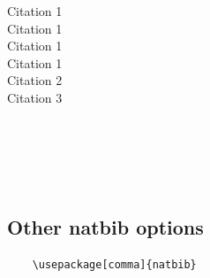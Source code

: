 \documentclass[12pts]{article}
\begin{document}
	Citation 1 \citet[p.~215]{dupas2013savings} \\
	Citation 1 \citep[p.~215]{dupas2013savings} \\
	
	
	Citation 1 \citep[see][]{dupas2013savings} \\
	Citation 1 \citep[see][p.~215]{dupas2013savings} \\
	
	Citation 2 \citep{alix2012forest} \\
	Citation 3 \citep*{alix2012forest}
	
	\citeauthor{de2008returns} \\
	\citeauthor*{de2008returns} \\
	\citeyear{de2008returns} \\ 
	\citeyearpar{de2008returns} \\ 
	
	
	\subsection{Other natbib options}

	\begin{verbatim}
	\usepackage[comma]{natbib}
	
	\end{verbatim}

	
	
\end{document}

